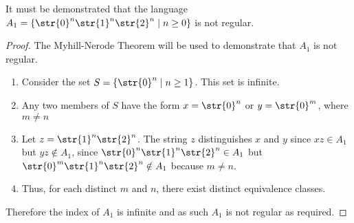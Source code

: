 It must be demonstrated that the language $A_1 = \{ \str{0}^n\str{1}^n\str{2}^n \mid n \geq 0 \}$ is not regular.
\begin{proof}
The Myhill-Nerode Theorem will be used to demonstrate that $A_1$ is not regular.
	\begin{enumerate}[label=\Roman*.]
		\item Consider the set $S = \{\str{0}^n \mid n \geq 1\}$. This set is infinite.
		\item Any two members of $S$ have the form $x = \str{0}^n$ or $y = \str{0}^m$, where $m \neq n$
		\item Let $z = \str{1}^n\str{2}^n$. The string $z$ distinguishes $x$ and $y$ since $xz \in A_1$ but $yz \notin A_1$, since $\str{0}^n\str{1}^n\str{2}^n \in A_1$ but $\str{0}^m\str{1}^n\str{2}^n \notin A_1$ because $m \neq n$.
		\item Thus, for each distinct $m$ and $n$, there exist distinct equivalence classes.
	\end{enumerate}
	Therefore the index of $A_1$ is infinite and as such $A_1$ is not regular as required.
\end{proof}